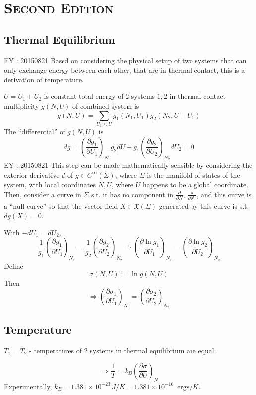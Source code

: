\documentclass[twoside]{amsart}
\theoremstyle{plain}
\theoremstyle{definition}
\begin{document}
\section{\textsc{Second Edition}
}

\subsection*{Thermal Equilibrium}

EY : 20150821 Based on considering the physical setup of two systems that can only exchange energy between each other, that are in thermal contact, this is a derivation of temperature.

$U = U_1 + U_2$ is constant total energy of 2 systems $1,2$ in thermal contact \\
multiplicity $g(N,U)$ of combined system is 
\[
g(N,U) = \sum_{U_1 \leq U} g_1(N_1,U_1)g_2(N_2,U-U_1)
\]
The ``differential'' of $g(N,U)$ is 
\[
dg = \left( \frac{\partial g_1}{ \partial U_1 } \right)_{N_1} g_2 dU + g_1\left( \frac{\partial g_2 }{ \partial U_2 } \right)_{N_2} dU_2 = 0 
\]
EY : 20150821 This step can be made mathematically sensible by considering the exterior derivative $d$ of $g \in C^{\infty}(\Sigma)$, where $\Sigma$ is the manifold of states of the system, with local coordinates $N,U$, where $U$ happens to be a global coordinate. Then, consider a curve in $\Sigma$ s.t. it has no component in $\frac{\partial}{ \partial N}$, $\frac{\partial}{ \partial N_1}$, and this curve is a ``null curve'' so that the vector field $X\in \mathfrak{X}(\Sigma)$ generated by this curve is s.t. $dg(X)=0$.  

With $-dU_1 = dU_2$,
\[
\frac{1}{g_1} \left( \frac{\partial g_1}{ \partial U_1}\right)_{N_1} = \frac{1}{g_2} \left( \frac{\partial g_2}{ \partial U_2} \right)_{N_2} \Longrightarrow \left( \frac{ \partial \ln{g_1} }{ \partial U_1} \right)_{N_1} = \left( \frac{ \partial \ln{g_2}}{ \partial U_2} \right)_{N_2}
\]
Define
\[
\sigma(N,U) := \ln{ g(N,U)}
\]
Then
\[
\Longrightarrow \left( \frac{ \partial \sigma_1}{ \partial U_1} \right)_{N_1} = \left( \frac{ \partial \sigma_2}{ \partial U_2} \right)_{N_2}
\]



\subsection*{Temperature}

$T_1=T_2$ - temperatures of 2 systems in thermal equilibrium are equal.  

\[
\Longrightarrow \frac{1}{T} = k_B \left( \frac{ \partial \sigma }{ \partial U} \right)_N
\]
Experimentally, $k_B = 1.381 \times 10^{-23} \, J/K = 1.381\times 10^{-16} \, \text{ ergs}/ K$.  
\end{document}
